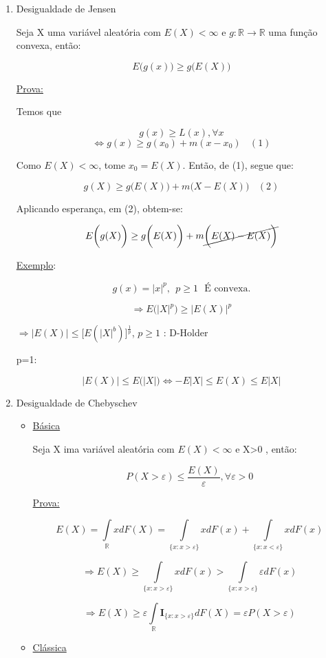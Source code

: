 \documentclass[a4paper,12pt]{article}
\begin{document}
\begin{enumerate}
	\item Desigualdade de Jensen
	
	Seja X uma variável aleatória com $E(X)<\infty$ e $g:\mathbb R \longrightarrow \mathbb R$ uma função convexa, então:
	
	$$E\bigg(g(x)\bigg)\ge g\bigg(E(X)\bigg) $$
	
	\underline{Prova:}
	
	Temos que 
	
	$$g(x)\ge L(x), \forall x $$
	$$\Leftrightarrow g(x) \ge g(x_0)+m(x-x_0) \ \ \ \  (1)$$
	
	Como $E(X)<\infty$, tome $x_0 =E(X)$. Então, de (1), segue que:
	
	$$g(X)\ge g\bigg(E(X)\bigg)+m\bigg(X-E(X)\bigg) \ \ \ \ (2) $$
	
	Aplicando esperança, em (2), obtem-se:
	
	$$E\bigg(
	g(X)
	\bigg)\ge g\bigg(
	E(X)
	\bigg)+m\cancel{\bigg(E(X)-E(X)\bigg)} $$
	
	\underline{Exemplo}:
	
	$$g(x) = |x|^p, \ \ p\ge 1  \ \ \  \text{É convexa}.$$
	
	$$\Rightarrow E\bigg(
	|X|^p
	\bigg)\ge \bigg|
	E(X)
	\bigg|^p $$
	
	$\Rightarrow \bigg|
	E(X)
	\bigg|\le 
	\bigg[
	E(|X|^b)
	\bigg]^{\frac{1}{p}}
	$, $p\ge 1$ : D-Holder
	
	p=1:
	
	$$\bigg|
	E(X)
	\bigg| \le E\bigg(|X|\bigg) \Leftrightarrow -E|X| \le E(X)\le E|X|$$
	\newpage 
	\item Desigualdade de Chebyschev
	
	\begin{itemize}
		\item \underline{Básica}
		
		Seja X ima variável aleatória com $E(X)<\infty$ e X>0 , então:
		
		$$P(X>\varepsilon) \le \frac{E(X)}{\varepsilon}, \forall \varepsilon>0$$
		
		\underline{Prova:}
		
		$$E(X) = \int\limits_{\mathbb R} xdF(X) = \int\limits_{\{x:x>\varepsilon\}}xdF(x)+\int\limits_{\{x:x<\varepsilon\}}xdF(x) $$
		
		$$\Rightarrow E(X) \ge\int\limits_{\{x:x>\varepsilon\}}xdF(x) > \int\limits_{\{x:x>\varepsilon\}}\varepsilon dF(x)  $$
		
		$$ \Rightarrow  E(X)  \ge \varepsilon \int\limits_{\mathbb R} \mathbf I_{\{ x:x>\varepsilon\}} dF(X)= \varepsilon P(X>\varepsilon)$$
\item \underline{Clássica}	


\end{itemize}
\end{enumerate}
\end{document}
